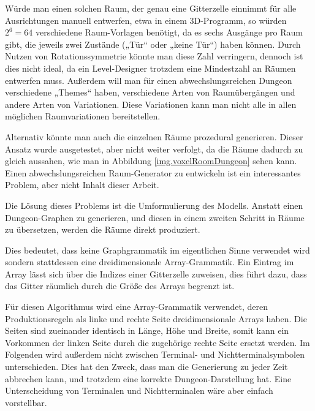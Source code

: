 
Würde man einen solchen Raum, der genau eine Gitterzelle einnimmt für alle Ausrichtungen manuell entwerfen, etwa in einem 3D-Programm, so würden $ 2^6 = 64 $ verschiedene Raum-Vorlagen benötigt, da es sechs Ausgänge pro Raum gibt, die jeweils zwei Zustände („Tür“ oder „keine Tür“) haben können. Durch Nutzen von Rotationssymmetrie könnte man diese Zahl verringern, dennoch ist dies nicht ideal, da ein Level-Designer trotzdem eine Mindestzahl an Räumen entwerfen muss. Außerdem will man für einen abwechslungsreichen Dungeon verschiedene „Themes“ haben, verschiedene Arten von Raumübergängen und andere Arten von Variationen. Diese Variationen kann man nicht alle in allen möglichen Raumvariationen bereitstellen. 

Alternativ könnte man auch die einzelnen Räume prozedural generieren. Dieser Ansatz wurde ausgetestet, aber nicht weiter verfolgt, da die Räume dadurch zu gleich aussahen, wie man in Abbildung \ref{img.voxelRoomDungeon} sehen kann. Einen abwechslungsreichen Raum-Generator zu entwickeln ist ein interessantes Problem, aber nicht Inhalt dieser Arbeit.


Die Lösung dieses Problems ist die Umformulierung des Modells. Anstatt einen Dungeon-Graphen zu generieren, und diesen in einem zweiten Schritt in Räume zu übersetzen, werden die Räume direkt produziert. 

Dies bedeutet, dass keine Graphgrammatik im eigentlichen Sinne verwendet wird sondern stattdessen eine dreidimensionale Array-Grammatik. Ein Eintrag im Array lässt sich über die Indizes einer Gitterzelle zuweisen, dies führt dazu, dass das Gitter räumlich durch die Größe des Arrays begrenzt ist.

Für diesen Algorithmus wird eine Array-Grammatik verwendet, deren Produktionsregeln als linke und rechte Seite dreidimensionale Arrays haben. Die Seiten sind zueinander identisch in Länge, Höhe und Breite, somit kann ein Vorkommen der linken Seite durch die zugehörige rechte Seite ersetzt werden. Im Folgenden wird außerdem nicht zwischen Terminal- und Nichtterminalsymbolen unterschieden. Dies hat den Zweck, dass man die Generierung zu jeder Zeit abbrechen kann, und trotzdem eine korrekte Dungeon-Darstellung hat. Eine Unterscheidung von Terminalen und Nichtterminalen wäre aber einfach vorstellbar.


